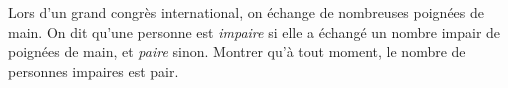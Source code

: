 Lors d'un grand congrès international, on échange de nombreuses poignées de main. On dit qu'une personne est \emph{impaire} si elle a échangé un nombre impair de poignées de main, et \emph{paire} sinon. Montrer qu'à tout moment, le nombre de personnes impaires est pair.
